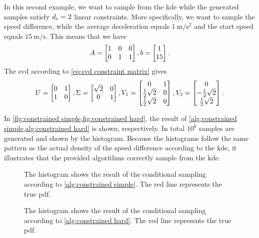 In this second example, we want to sample from the \ac{kde} while the generated samples satisfy $d_\mathrm{c}=2$ linear constraints.
More specifically, we want to sample the speed difference, while the average deceleration equals $\SI{1}{\meter\per\second\squared}$ and the start speed equals $\SI{15}{\meter\per\second}$. 
This means that we have
\begin{equation}
	A = \begin{bmatrix} 1 & 0 & 0 \\ 0 & 1 & 1 \end{bmatrix}, 
	b = \begin{bmatrix} 1 \\ 15 \end{bmatrix}.
\end{equation}
The \ac{svd} according to \cref{eq:svd constraint matrix} gives
\begin{equation}
	U = \begin{bmatrix} 0 & 1 \\ 1 & 0 \end{bmatrix},
	\Sigma = \begin{bmatrix} \sqrt{2} & 0 \\ 0 & 1 \end{bmatrix},
	V_1 = \begin{bmatrix} 0 & 1 \\ \frac{1}{2}\sqrt{2} & 0 \\ \frac{1}{2}\sqrt{2} & 0 \end{bmatrix},
	V_2 = \begin{bmatrix} 0 \\ -\frac{1}{2}\sqrt{2} \\ \frac{1}{2}\sqrt{2} \end{bmatrix}.
\end{equation}

In \cref{fig:constrained simple,fig:constrained hard}, the result of \cref{alg:constrained simple,alg:constrained hard} is shown, respectively. 
In total $10^6$ samples are generated and shown by the histogram. 
Because the histograms follow the same pattern as the actual density of the speed difference according to the \ac{kde}, it illustrates that the provided algorithms correctly sample from the \ac{kde}. 

\begin{figure}
	\centering
	
	\caption{The histogram shows the result of the conditional sampling according to \cref{alg:constrained simple}. The red line represents the true \ac{pdf}.}
	\label{fig:constrained simple}
\end{figure}

\begin{figure}
	\centering
	
	\caption{The histogram shows the result of the conditional sampling according to \cref{alg:constrained hard}. The red line represents the true \ac{pdf}.}
	\label{fig:constrained hard}
\end{figure}
